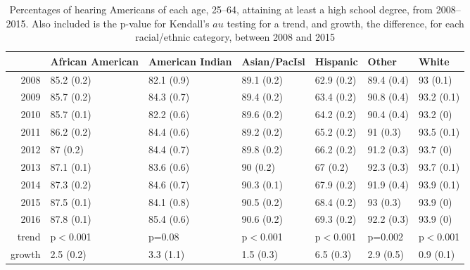 \documentclass{article}\usepackage[]{graphicx}\usepackage[]{color}
\begin{document}
\begin{table}[ht]
\centering
\begin{tabular}{rllllll}
  \hline
 & African American & American Indian & Asian/PacIsl & Hispanic & Other & White \\
  \hline
2008 & 85.2 (0.2) & 82.1 (0.9) & 89.1 (0.2) & 62.9 (0.2) & 89.4 (0.4) & 93 (0.1) \\
  2009 & 85.7 (0.2) & 84.3 (0.7) & 89.4 (0.2) & 63.4 (0.2) & 90.8 (0.4) & 93.2 (0.1) \\
  2010 & 85.7 (0.1) & 82.2 (0.6) & 89.6 (0.2) & 64.2 (0.2) & 90.4 (0.4) & 93.2 (0) \\
  2011 & 86.2 (0.2) & 84.4 (0.6) & 89.2 (0.2) & 65.2 (0.2) & 91 (0.3) & 93.5 (0.1) \\
  2012 & 87 (0.2) & 84.4 (0.7) & 89.8 (0.2) & 66.2 (0.2) & 91.2 (0.3) & 93.7 (0) \\
  2013 & 87.1 (0.1) & 83.6 (0.6) & 90 (0.2) & 67 (0.2) & 92.3 (0.3) & 93.7 (0.1) \\
  2014 & 87.3 (0.2) & 84.6 (0.7) & 90.3 (0.1) & 67.9 (0.2) & 91.9 (0.4) & 93.9 (0.1) \\
  2015 & 87.5 (0.1) & 84.1 (0.8) & 90.5 (0.2) & 68.4 (0.2) & 93 (0.3) & 93.9 (0) \\
  2016 & 87.8 (0.1) & 85.4 (0.6) & 90.6 (0.2) & 69.3 (0.2) & 92.2 (0.3) & 93.9 (0) \\
  trend & p$<$0.001 & p=0.08 & p$<$0.001 & p$<$0.001 & p=0.002 & p$<$0.001 \\
  growth & 2.5 (0.2) & 3.3 (1.1) & 1.5 (0.3) & 6.5 (0.3) & 2.9 (0.5) & 0.9 (0.1) \\
   \hline
\end{tabular}
\caption{Percentages of hearing Americans of each age, 25--64, attaining at least a high school degree, from 2008--2015. Also included is the p-value for Kendall's $	au$ testing for a trend, and growth, the difference, for each racial/ethnic category, between 2008 and 2015}
\end{table}
\end{document}
